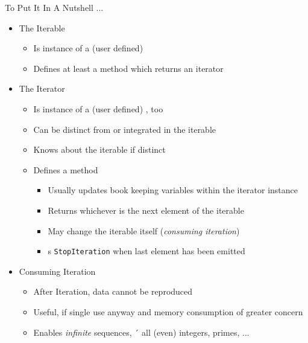 \begin{frame}{To Put It In A Nutshell ...}
%
\begin{itemize}
\item The Iterable
	\begin{itemize}
	\item Is instance of a (user defined) 
	\item Defines at least a method  which returns an iterator
	\end{itemize}
\item The Iterator
	\begin{itemize}
	\item Is instance of a (user defined) , too
	\item Can be distinct from or integrated in the iterable
	\item Knows about the iterable if distinct
	\item Defines a method 
		\begin{itemize}
		\item Usually updates book keeping variables within the iterator instance
		\item Returns whichever is the next element of the iterable
		\item May change the iterable itself (\Thus \emph{consuming iteration})
		\item {}s \texttt{StopIteration} when last element has been emitted
		\end{itemize}
	\end{itemize}
\item Consuming Iteration
	\begin{itemize}
	\item After Iteration, data cannot be reproduced
	\item Useful, if single use anyway and memory consumption of greater concern
	\item Enables \emph{infinite} sequences, \zB´ all (even) integers, primes, ...
	\end{itemize}
\end{itemize}
%
\end{frame}


